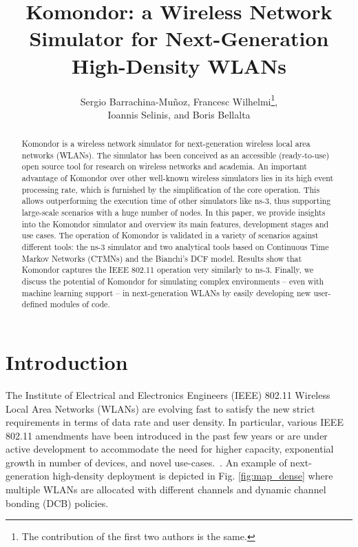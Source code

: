 \documentclass{article}
\begin{document}
		\setcounter{page}{106}
	\title{Komondor: a Wireless Network Simulator for Next-Generation High-Density WLANs}

	\author{Sergio Barrachina-Muñoz, Francesc Wilhelmi\thanks{The contribution of the first two authors is the same.},\\ Ioannis Selinis, and Boris Bellalta}
	\date{ }
	\maketitle

	\begin{abstract}
		Komondor is a wireless network simulator for next-generation wireless local area networks (WLANs). The simulator has been conceived as an accessible (ready-to-use) open source tool for research on wireless networks and academia. An important advantage of Komondor over other well-known wireless simulators lies in its high event processing rate, which is furnished by the simplification of the core operation. This allows outperforming the execution time of other simulators like ns-3, thus supporting large-scale scenarios with a huge number of nodes. In this paper, we provide insights into the Komondor simulator and overview its main features, development stages and use cases. The operation of Komondor is validated in a variety of scenarios against different tools: the ns-3 simulator and two analytical tools based on Continuous Time Markov Networks (CTMNs) and the Bianchi's DCF model. Results show that Komondor captures the IEEE 802.11 operation very similarly to ns-3. Finally, we discuss the potential of Komondor for simulating complex environments -- even with machine learning support -- in next-generation WLANs by easily developing new user-defined modules of code.
	\end{abstract}
	
	\section{Introduction}
	\label{section:introduction}
	
	The Institute of Electrical and Electronics Engineers (IEEE) 802.11 Wireless Local Area Networks (WLANs) are evolving fast to satisfy the new strict requirements in terms of data rate and user density. In particular, various IEEE 802.11 amendments have been introduced in the past few years or are under active development to accommodate the need for higher capacity, exponential growth in number of devices, and novel use-cases.~\cite{8485317_selOA}. An example of next-generation high-density deployment is depicted in Fig. \ref{fig:map_dense} where multiple WLANs are allocated with different channels and dynamic channel bonding (DCB) policies.
	
\end{document}
